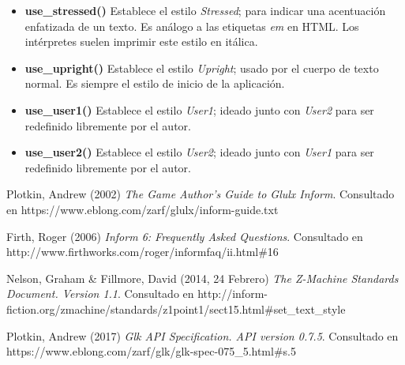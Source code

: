 \documentclass[a4paper,12pt]{article}
\numberwithin{equation}{section}
\begin{document}
\begin{itemize}
	\item \textbf{use\_stressed()} Establece el estilo \emph{Stressed}; para indicar una acentuación enfatizada de un texto. Es análogo a las etiquetas \emph{em} en HTML. Los intérpretes suelen imprimir este estilo en itálica.

	\item \textbf{use\_upright()} Establece el estilo \emph{Upright}; usado por el cuerpo de texto normal. Es siempre el estilo de inicio de la aplicación.

	\item \textbf{use\_user1()} Establece el estilo \emph{User1}; ideado junto con \emph{User2} para ser redefinido libremente por el autor.

	\item \textbf{use\_user2()} Establece el estilo \emph{User2}; ideado junto con \emph{User1} para ser redefinido libremente por el autor.

\end{itemize}


\begin{thebibliography}{4}

	 Plotkin, Andrew (2002) \emph{The Game Author's Guide to Glulx Inform}. Consultado en https://www.eblong.com/zarf/glulx/inform-guide.txt

	 Firth, Roger (2006) \emph{Inform 6: Frequently Asked Questions}. Consultado en http://www.firthworks.com/roger/informfaq/ii.html\#16

	 Nelson, Graham \& Fillmore, David (2014, 24 Febrero) \emph{The Z-Machine Standards Document. Version 1.1}. Consultado en http://inform-fiction.org/zmachine/standards/z1point1/sect15.html\#set\_text\_style

	 Plotkin, Andrew (2017) \emph{Glk API Specification. API version 0.7.5}. Consultado en https://www.eblong.com/zarf/glk/glk-spec-075\_5.html\#s.5

\end{thebibliography}


\end{document}
